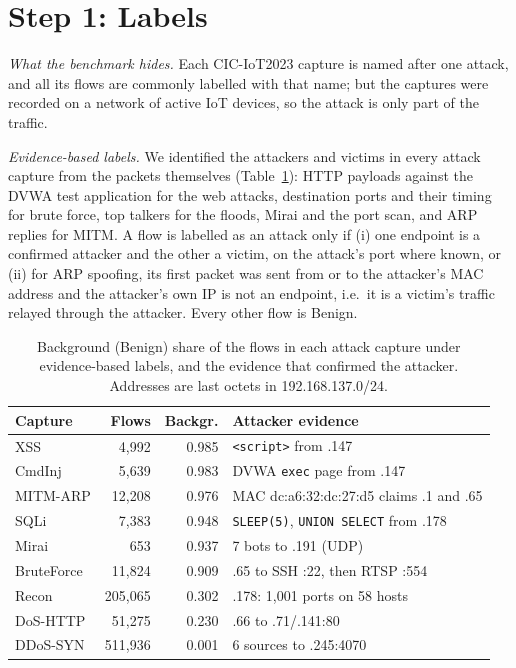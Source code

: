 \section{Step 1: Labels}\label{sec:labels}

\emph{What the benchmark hides.} Each CIC-IoT2023 capture is named after one attack, and all its flows are commonly labelled with that name; but the captures were recorded on a network of active IoT devices, so the attack is only part of the traffic.

\emph{Evidence-based labels.} We identified the attackers and victims in every attack capture from the packets themselves (Table~\ref{tab:background}): HTTP payloads against the DVWA test application for the web attacks, destination ports and their timing for brute force, top talkers for the floods, Mirai and the port scan, and ARP replies for MITM. A flow is labelled as an attack only if (i) one endpoint is a confirmed attacker and the other a victim, on the attack's port where known, or (ii) for ARP spoofing, its first packet was sent from or to the attacker's MAC address and the attacker's own IP is not an endpoint, i.e.\ it is a victim's traffic relayed through the attacker. Every other flow is Benign.

\begin{table}[t]
\centering
\caption{Background (Benign) share of the flows in each attack capture under evidence-based labels, and the evidence that confirmed the attacker. Addresses are last octets in 192.168.137.0/24.}
\label{tab:background}
\footnotesize
\setlength{\tabcolsep}{3pt}
\begin{tabular}{lrrp{3.6cm}}
\hline
Capture & Flows & Backgr. & Attacker evidence \\
\hline
XSS          &   4,992 & 0.985 & \texttt{<script>} from .147 \\
CmdInj       &   5,639 & 0.983 & DVWA \texttt{exec} page from .147 \\
MITM-ARP     &  12,208 & 0.976 & MAC dc:a6:32:dc:27:d5 claims .1 and .65 \\
SQLi         &   7,383 & 0.948 & \texttt{SLEEP(5)}, \texttt{UNION SELECT} from .178 \\
Mirai        &     653 & 0.937 & 7 bots to .191 (UDP) \\
BruteForce   &  11,824 & 0.909 & .65 to SSH :22, then RTSP :554 \\
Recon        & 205,065 & 0.302 & .178: 1,001 ports on 58 hosts \\
DoS-HTTP     &  51,275 & 0.230 & .66 to .71/.141:80 \\
DDoS-SYN     & 511,936 & 0.001 & 6 sources to .245:4070 \\
\hline
\end{tabular}
\end{table}

